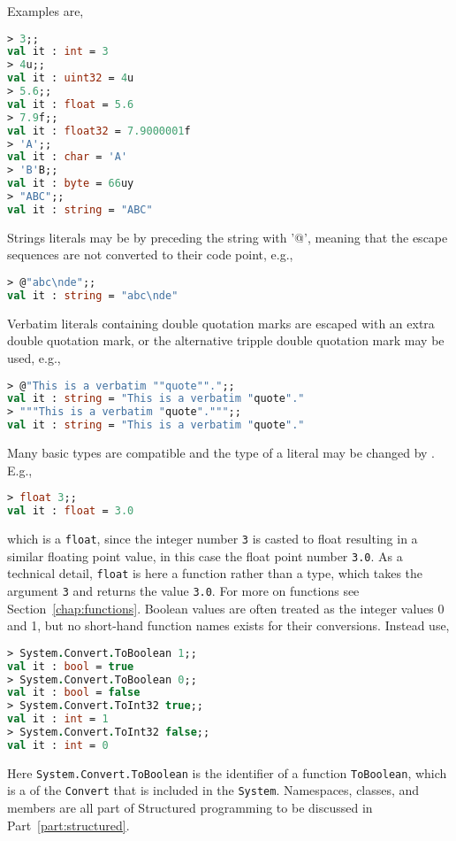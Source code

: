 Examples are,
\begin{lstlisting}[language=fsharp,caption={fsharpi, Named and implied literals.}]
> 3;;
val it : int = 3
> 4u;; 
val it : uint32 = 4u
> 5.6;;
val it : float = 5.6
> 7.9f;;
val it : float32 = 7.9000001f
> 'A';;
val it : char = 'A'
> 'B'B;;
val it : byte = 66uy
> "ABC";;
val it : string = "ABC"
\end{lstlisting}
%
Strings literals may be  by preceding the string with '@', meaning that the escape sequences are not converted to their code point, e.g., 
\begin{lstlisting}[language=fsharp,caption={fsharpi, examples of string literals.}]
> @"abc\nde";;
val it : string = "abc\nde"
\end{lstlisting}
%
Verbatim literals containing double quotation marks are escaped with an extra double quotation mark, or the alternative tripple double quotation mark may be used, e.g.,
%
\begin{lstlisting}[language=fsharp,caption={fsharpi, example of double quotation marks in verbatim string literals.}]
> @"This is a verbatim ""quote"".";;
val it : string = "This is a verbatim "quote"."
> """This is a verbatim "quote".""";; 
val it : string = "This is a verbatim "quote"."
\end{lstlisting}
%

Many basic types are compatible and the type of a literal may be changed by . E.g.,
%
\begin{lstlisting}[language=fsharp,caption={fsharpi, casting an integer to a floating point number.},label=upcasting]
> float 3;;
val it : float = 3.0
\end{lstlisting}
which is a \lstinline!float!, since the integer number \lstinline|3| is casted to float resulting in a similar floating point value, in this case the float point number \lstinline|3.0|. As a technical detail, \lstinline|float| is here a function rather than a type, which takes the argument \lstinline|3| and returns the value \lstinline|3.0|.  For more on functions see Section~\ref{chap:functions}. Boolean values are often treated as the integer values 0 and 1, but no short-hand function names exists for their conversions. Instead use,
%
\begin{lstlisting}[language=fsharp,caption={fsharpi, casting booleans.}]
> System.Convert.ToBoolean 1;;
val it : bool = true
> System.Convert.ToBoolean 0;;
val it : bool = false
> System.Convert.ToInt32 true;;
val it : int = 1
> System.Convert.ToInt32 false;;
val it : int = 0
\end{lstlisting}
Here \lstinline|System.Convert.ToBoolean| is the identifier of a function \lstinline|ToBoolean|, which is a  of the  \lstinline|Convert| that is included in the  \lstinline|System|. Namespaces, classes, and members are all part of Structured programming to be discussed in Part~\ref{part:structured}.

